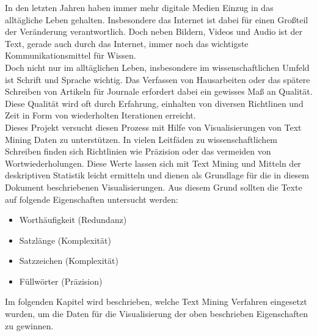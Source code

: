 

\maketitle

In den letzten Jahren haben immer mehr digitale Medien Einzug in das alltägliche Leben gehalten. Insbesondere das Internet ist dabei für einen Großteil der Veränderung verantwortlich. Doch neben Bildern, Videos und Audio ist der Text, gerade auch durch das Internet, immer noch das wichtigste Kommunikationsmittel für Wissen.\\

Doch nicht nur im alltäglichen Leben, insbesondere im wissenschaftlichen Umfeld ist Schrift und Sprache wichtig. Das Verfassen von Hausarbeiten oder das spätere Schreiben von Artikeln für Journale erfordert dabei ein gewisses Maß an Qualität. Diese Qualität wird oft durch Erfahrung, einhalten von diversen Richtlinen und Zeit in Form von wiederholten Iterationen erreicht.\\

Dieses Projekt versucht diesen Prozess mit Hilfe von Visualisierungen von Text Mining Daten zu unterstützen. In vielen Leitfäden zu wissenschaftlichem Schreiben finden sich Richtlinien wie Präzision oder das vermeiden von Wortwiederholungen. Diese Werte lassen sich mit Text Mining und Mitteln der deskriptiven Statistik leicht ermitteln und dienen als Grundlage für die in diesem Dokument beschriebenen Visualisierungen. Aus diesem Grund sollten die Texte auf folgende Eigenschaften untersucht werden:\\

\begin{itemize}
\item Worthäufigkeit (Redundanz)
\item Satzlänge (Komplexität)
\item Satzzeichen (Komplexität)
\item Füllwörter (Präzision)
\end{itemize}

Im folgenden Kapitel wird beschrieben, welche Text Mining Verfahren eingesetzt wurden, um die Daten für die Visualisierung der oben beschrieben Eigenschaften zu gewinnen. 